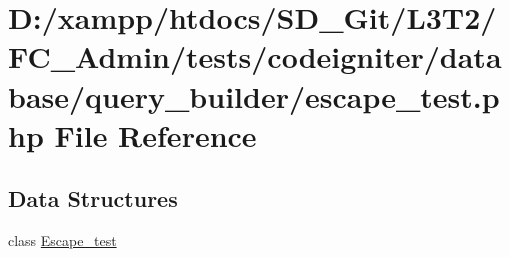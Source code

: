 \hypertarget{_admin_2tests_2codeigniter_2database_2query__builder_2escape__test_8php}{}\section{D\+:/xampp/htdocs/\+S\+D\+\_\+\+Git/\+L3\+T2/\+F\+C\+\_\+\+Admin/tests/codeigniter/database/query\+\_\+builder/escape\+\_\+test.php File Reference}
\label{_admin_2tests_2codeigniter_2database_2query__builder_2escape__test_8php}
\subsection*{Data Structures}
\begin{DoxyCompactItemize}
\item 
class \hyperlink{class_escape__test}{Escape\+\_\+test}
\end{DoxyCompactItemize}
